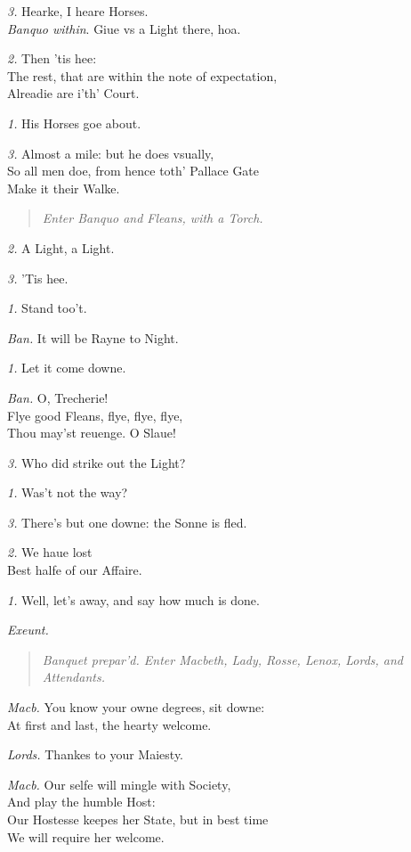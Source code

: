 \documentclass[12pt]{sides}
\newcommand{\StageDir}[1]{\begin{quote}\centering\em #1\end{quote}}
\newcommand{\elStageDir}[1]{\hfill\textit{#1}}
\newcommand{\dia}[1]{\hskip 15pt\textit{#1}\hskip 6pt}
\begin{document}
\begin{multicols}{2}
            \dia{3.} Hearke, I heare Horses. \\ \textit{Banquo within}. Giue vs a Light there, hoa.

            \dia{2.} Then 'tis hee: \\ The rest, that are within the note of expectation, \\ Alreadie are i'th' Court.

            \dia{1.} His Horses goe about.

            \dia{3.} Almost a mile: but he does vsually, \\ So all men doe, from hence toth' Pallace Gate \\ Make it their Walke.
            \StageDir{Enter Banquo and Fleans, with a Torch.}
            \dia{2.} A Light, a Light.

            \dia{3.} 'Tis hee.

            \dia{1.} Stand too't.

            \dia{Ban.} It will be Rayne to Night.

            \dia{1.} Let it come downe.

            \dia{Ban.} O, Trecherie! \\ Flye good Fleans, flye, flye, flye, \\ Thou may'st reuenge. O Slaue!

            \dia{3.} Who did strike out the Light?

            \dia{1.} Was't not the way?

            \dia{3.} There's but one downe: the Sonne is fled.

            \dia{2.} We haue lost \\ Best halfe of our Affaire.

            \dia{1.} Well, let's away, and say how much is done.
            
            \elStageDir{Exeunt.} \hspace{64pt}
            \StageDir{Banquet prepar'd. Enter Macbeth, Lady, Rosse, Lenox, Lords, and Attendants.} %
            \dia{Macb.} You know your owne degrees, sit downe: \\ At first and last, the hearty welcome.

            \dia{Lords.} Thankes to your Maiesty.

            \dia{Macb.} Our selfe will mingle with Society, \\ And play the humble Host: \\ Our Hostesse keepes her State, but in best time \\ We will require her welcome.


\end{multicols}
\end{document}
